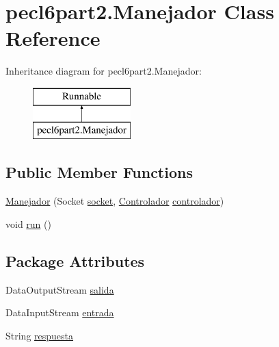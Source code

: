 \hypertarget{classpecl6part2_1_1_manejador}{}\section{pecl6part2.\+Manejador Class Reference}
\label{classpecl6part2_1_1_manejador}
Inheritance diagram for pecl6part2.\+Manejador\+:\begin{figure}[H]
\begin{center}
\leavevmode
\includegraphics[height=2.000000cm]{classpecl6part2_1_1_manejador}
\end{center}
\end{figure}
\subsection*{Public Member Functions}
\begin{DoxyCompactItemize}
\item 
\mbox{\hyperlink{classpecl6part2_1_1_manejador_a2dfa6bc9597c33674de7f04523bbd225}{Manejador}} (Socket \mbox{\hyperlink{classpecl6part2_1_1_manejador_abc6cd500e4ba790bc3ec8415b15c4402}{socket}}, \mbox{\hyperlink{classpecl6part2_1_1_controlador}{Controlador}} \mbox{\hyperlink{classpecl6part2_1_1_manejador_a8c505f81f85f3c9966ab7e7b1df1ce52}{controlador}})
\item 
void \mbox{\hyperlink{classpecl6part2_1_1_manejador_a373cdf24e59b78b7a7b17253ba048d65}{run}} ()
\end{DoxyCompactItemize}
\subsection*{Package Attributes}
\begin{DoxyCompactItemize}
\item 
Data\+Output\+Stream \mbox{\hyperlink{classpecl6part2_1_1_manejador_aa4962e22248b79c0b03d8e664665f8c7}{salida}}
\item 
Data\+Input\+Stream \mbox{\hyperlink{classpecl6part2_1_1_manejador_a77a06f1b0bf9b5c096f487d78d8297ba}{entrada}}
\item 
String \mbox{\hyperlink{classpecl6part2_1_1_manejador_a07653dd76eb61d9ca9e453f63d97a700}{respuesta}}
\end{DoxyCompactItemize}
